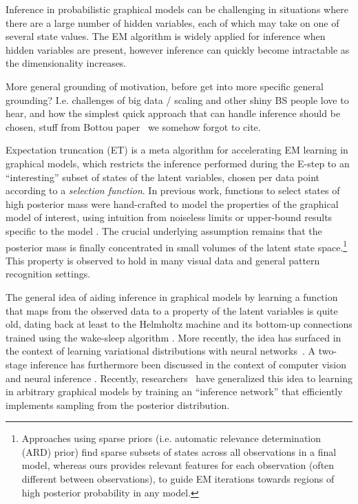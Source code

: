 Inference in probabilistic graphical models can be challenging in situations where
there are a large number of hidden variables, each of which may take on one of several
state values. The EM algorithm is widely applied for inference when hidden variables
are present, however inference can quickly become intractable as the dimensionality increases.

More general grounding of motivation, before get into more specific general grounding?  I.e. challenges of big data / scaling and other shiny BS people love to hear, and how the simplest quick approach that can handle inference should be chosen, stuff from Bottou paper~\cite{Bottou08thetradeoffs} we somehow forgot to cite.


Expectation truncation (ET) \citep{LuckeEggert2010} is a meta algorithm for accelerating EM learning
in graphical models, which restricts the inference performed during the E-step
to an ``interesting'' subset of states of the latent variables,  %
chosen per data point according to a \emph{selection function}.
In previous work, functions to select states of high posterior mass were hand-crafted to model the properties of the graphical model of interest, using intuition from noiseless limits or upper-bound results specific to the model \citep{LuckeEggert2010,SheltonEtAl2012,BornscheinEtAl2013,SheikhEtAl2014}.
The crucial underlying assumption remains that the posterior mass is finally concentrated in small volumes of the latent state space.\footnote{Approaches using sparse priors (i.e. automatic relevance determination (ARD) prior) find sparse subsets of states across all observations in a final model, whereas ours provides relevant features for each observation (often different between observations), to guide EM iterations towards regions of high posterior probability in any model.}
This property is observed to hold in many visual data and general pattern recognition settings.

The general idea of aiding inference in graphical models by
learning a function that maps from the observed data to
a property of the latent variables is quite old, dating back at least to the
Helmholtz machine and its bottom-up connections trained using the wake-sleep
algorithm \citep{HintonEtAl1995}.
More recently, the idea has surfaced in the context of learning variational distributions with neural networks~\citep{WellingICML2014}.
A two-stage inference has furthermore been discussed in the context of
computer vision \citep{YuilleKersten2006} and neural inference \citep{KoernerEtAl1999}.
Recently, researchers~\citep{MnihGregor2014} %
have generalized this idea to learning in arbitrary graphical models by training
an ``inference network'' that efficiently implements sampling from the posterior
distribution.

